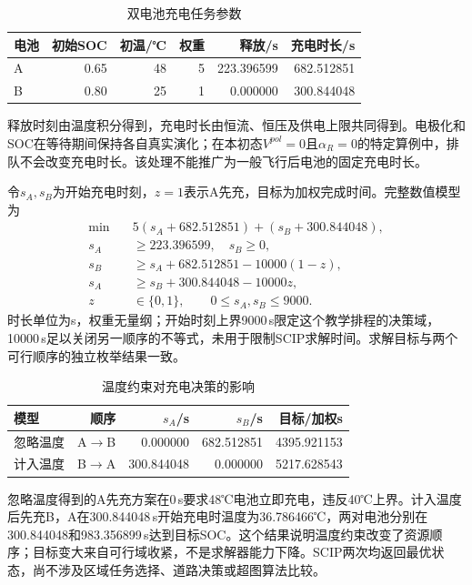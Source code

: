 \begin{table}[htbp]\centering
\caption{双电池充电任务参数}\label{tab:charge_jobs}
\begin{tabular}{lrrrrr}\toprule
电池 & 初始SOC & 初温/℃ & 权重 & 释放/s & 充电时长/s\\\midrule
A & 0.65 & 48 & 5 & 223.396599 & 682.512851\\
B & 0.80 & 25 & 1 & 0.000000 & 300.844048\\
\bottomrule\end{tabular}\end{table}
释放时刻由温度积分得到，充电时长由恒流、恒压及供电上限共同得到。电极化和SOC在等待期间保持各自真实演化；在本初态$V^{pol}=0$且$\alpha_R=0$的特定算例中，排队不会改变充电时长。该处理不能推广为一般飞行后电池的固定充电时长。

令$s_A,s_B$为开始充电时刻，$z=1$表示A先充，目标为加权完成时间。完整数值模型为
\begin{align}
 \min\quad &5(s_A+682.512851)+(s_B+300.844048),\\
 s_A&\ge223.396599,\quad s_B\ge0,\\
 s_B&\ge s_A+682.512851-10000(1-z),\\
 s_A&\ge s_B+300.844048-10000z,\\
 z&\in\{0,1\},\qquad0\le s_A,s_B\le9000.
 \label{s0505:numeric_schedule}
\end{align}
时长单位为s，权重无量纲；开始时刻上界9000\,s限定这个教学排程的决策域，10000\,s足以关闭另一顺序的不等式，未用于限制SCIP求解时间。求解目标与两个可行顺序的独立枚举结果一致。

\begin{table}[htbp]\centering
\caption{温度约束对充电决策的影响}
\begin{tabular}{lrrrr}\toprule
模型 & 顺序 & $s_A$/s & $s_B$/s & 目标/加权s\\\midrule
忽略温度 & A$\to$B & 0.000000 & 682.512851 & 4395.921153\\
计入温度 & B$\to$A & 300.844048 & 0.000000 & 5217.628543\\
\bottomrule\end{tabular}\end{table}
忽略温度得到的A先充方案在0\,s要求48℃电池立即充电，违反40℃上界。计入温度后先充B，A在300.844048\,s开始充电时温度为36.786466℃，两对电池分别在300.844048和983.356899\,s达到目标SOC。这个结果说明温度约束改变了资源顺序；目标变大来自可行域收紧，不是求解器能力下降。SCIP两次均返回最优状态，尚不涉及区域任务选择、道路决策或超图算法比较。
